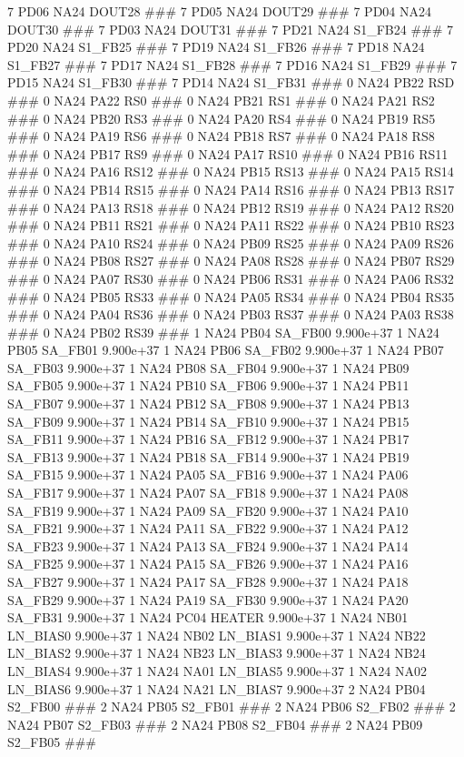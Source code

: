 7 PD06 NA24 DOUT28 ### 
7 PD05 NA24 DOUT29 ### 
7 PD04 NA24 DOUT30 ### 
7 PD03 NA24 DOUT31 ### 
7 PD21 NA24 S1_FB24 ### 
7 PD20 NA24 S1_FB25 ### 
7 PD19 NA24 S1_FB26 ### 
7 PD18 NA24 S1_FB27 ### 
7 PD17 NA24 S1_FB28 ### 
7 PD16 NA24 S1_FB29 ### 
7 PD15 NA24 S1_FB30 ### 
7 PD14 NA24 S1_FB31 ### 
0 NA24 PB22 RSD ### 
0 NA24 PA22 RS0 ### 
0 NA24 PB21 RS1 ### 
0 NA24 PA21 RS2 ### 
0 NA24 PB20 RS3 ### 
0 NA24 PA20 RS4 ### 
0 NA24 PB19 RS5 ### 
0 NA24 PA19 RS6 ### 
0 NA24 PB18 RS7 ### 
0 NA24 PA18 RS8 ### 
0 NA24 PB17 RS9 ### 
0 NA24 PA17 RS10 ### 
0 NA24 PB16 RS11 ### 
0 NA24 PA16 RS12 ### 
0 NA24 PB15 RS13 ### 
0 NA24 PA15 RS14 ### 
0 NA24 PB14 RS15 ### 
0 NA24 PA14 RS16 ### 
0 NA24 PB13 RS17 ### 
0 NA24 PA13 RS18 ### 
0 NA24 PB12 RS19 ### 
0 NA24 PA12 RS20 ### 
0 NA24 PB11 RS21 ### 
0 NA24 PA11 RS22 ### 
0 NA24 PB10 RS23 ### 
0 NA24 PA10 RS24 ### 
0 NA24 PB09 RS25 ### 
0 NA24 PA09 RS26 ### 
0 NA24 PB08 RS27 ### 
0 NA24 PA08 RS28 ### 
0 NA24 PB07 RS29 ### 
0 NA24 PA07 RS30 ### 
0 NA24 PB06 RS31 ### 
0 NA24 PA06 RS32 ### 
0 NA24 PB05 RS33 ### 
0 NA24 PA05 RS34 ### 
0 NA24 PB04 RS35 ### 
0 NA24 PA04 RS36 ### 
0 NA24 PB03 RS37 ### 
0 NA24 PA03 RS38 ### 
0 NA24 PB02 RS39 ### 
1 NA24 PB04 SA_FB00 9.900e+37 
1 NA24 PB05 SA_FB01 9.900e+37 
1 NA24 PB06 SA_FB02 9.900e+37 
1 NA24 PB07 SA_FB03 9.900e+37 
1 NA24 PB08 SA_FB04 9.900e+37 
1 NA24 PB09 SA_FB05 9.900e+37 
1 NA24 PB10 SA_FB06 9.900e+37 
1 NA24 PB11 SA_FB07 9.900e+37 
1 NA24 PB12 SA_FB08 9.900e+37 
1 NA24 PB13 SA_FB09 9.900e+37 
1 NA24 PB14 SA_FB10 9.900e+37 
1 NA24 PB15 SA_FB11 9.900e+37 
1 NA24 PB16 SA_FB12 9.900e+37 
1 NA24 PB17 SA_FB13 9.900e+37 
1 NA24 PB18 SA_FB14 9.900e+37 
1 NA24 PB19 SA_FB15 9.900e+37 
1 NA24 PA05 SA_FB16 9.900e+37 
1 NA24 PA06 SA_FB17 9.900e+37 
1 NA24 PA07 SA_FB18 9.900e+37 
1 NA24 PA08 SA_FB19 9.900e+37 
1 NA24 PA09 SA_FB20 9.900e+37 
1 NA24 PA10 SA_FB21 9.900e+37 
1 NA24 PA11 SA_FB22 9.900e+37 
1 NA24 PA12 SA_FB23 9.900e+37 
1 NA24 PA13 SA_FB24 9.900e+37 
1 NA24 PA14 SA_FB25 9.900e+37 
1 NA24 PA15 SA_FB26 9.900e+37 
1 NA24 PA16 SA_FB27 9.900e+37 
1 NA24 PA17 SA_FB28 9.900e+37 
1 NA24 PA18 SA_FB29 9.900e+37 
1 NA24 PA19 SA_FB30 9.900e+37 
1 NA24 PA20 SA_FB31 9.900e+37 
1 NA24 PC04 HEATER 9.900e+37 
1 NA24 NB01 LN_BIAS0 9.900e+37 
1 NA24 NB02 LN_BIAS1 9.900e+37 
1 NA24 NB22 LN_BIAS2 9.900e+37 
1 NA24 NB23 LN_BIAS3 9.900e+37 
1 NA24 NB24 LN_BIAS4 9.900e+37 
1 NA24 NA01 LN_BIAS5 9.900e+37 
1 NA24 NA02 LN_BIAS6 9.900e+37 
1 NA24 NA21 LN_BIAS7 9.900e+37 
2 NA24 PB04 S2_FB00 ### 
2 NA24 PB05 S2_FB01 ### 
2 NA24 PB06 S2_FB02 ### 
2 NA24 PB07 S2_FB03 ### 
2 NA24 PB08 S2_FB04 ### 
2 NA24 PB09 S2_FB05 ### 
